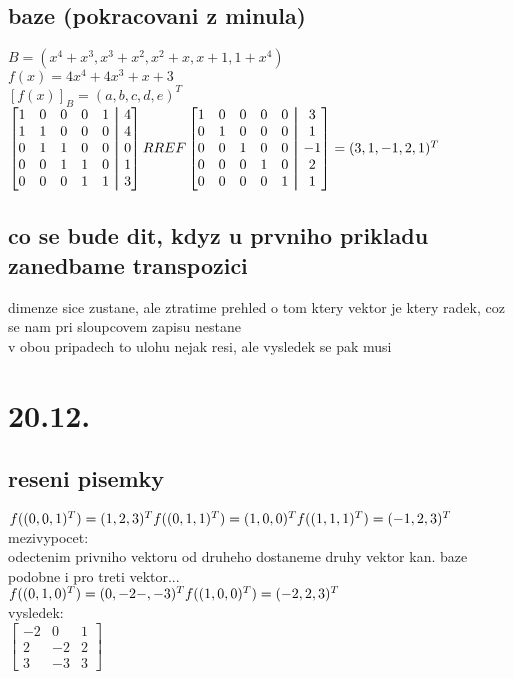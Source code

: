 \documentclass[a4paper]{article}
\newcommand\aug{\fboxsep=-\fboxrule\!\!\!\fbox{\strut}\!\!\!}
\begin{document}
\subsection{baze (pokracovani z minula)}
$B=(x^4+x^3, x^3+x^2, x^2+x, x+1, 1+x^4)$
\\
$f(x)=4x^4+4x^3+x+3$
\\
$[f(x)]_B = (a,b,c,d,e)^T$
\\
$
\begin{bmatrix}
	1 & 0 & 0 & 0 & 1 &\aug& 4 \\
	1 & 1 & 0 & 0 & 0 &\aug& 4 \\
	0 & 1 & 1 & 0 & 0 &\aug& 0 \\
	0 & 0 & 1 & 1 & 0 &\aug& 1 \\
	0 & 0 & 0 & 1 & 1 &\aug& 3
\end{bmatrix}
RREF
\begin{bmatrix}
	1 & 0 & 0 & 0 & 0 &\aug& 3 \\
	0 & 1 & 0 & 0 & 0 &\aug& 1 \\
	0 & 0 & 1 & 0 & 0 &\aug& -1 \\
	0 & 0 & 0 & 1 & 0 &\aug& 2 \\
	0 & 0 & 0 & 0 & 1 &\aug& 1
\end{bmatrix}
=(3,1,-1,2,1)^T
$


\subsection{co se bude dit, kdyz u prvniho prikladu zanedbame transpozici}
dimenze sice zustane, ale ztratime prehled o tom ktery vektor je ktery radek,
coz se nam pri sloupcovem zapisu nestane
\\
v obou pripadech to ulohu nejak resi, ale vysledek se pak musi 
\\



\section{20.12.}
\subsection{reseni pisemky}
$
f((0,0,1)^T)=(1,2,3)^T\\
f((0,1,1)^T)=(1,0,0)^T\\
f((1,1,1)^T)=(-1,2,3)^T\\
$
\\mezivypocet:\\
odectenim privniho vektoru od druheho dostaneme druhy vektor kan. baze\\
podobne i pro treti vektor...\\
$
f((0,1,0)^T) = (0,-2-,-3)^T\\
f((1,0,0)^T) = (-2,2,3)^T\\
$
\\vysledek:\\
$
\begin{bmatrix}
	-2 & 0 & 1 \\
	2 & -2 & 2 \\
	3 & -3 & 3 
\end{bmatrix}
$
\end{document}
